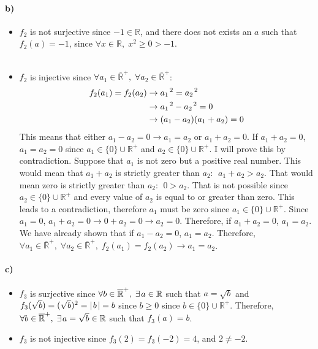 \documentclass[12pt]{article}
\newcommand\+{\mkern2mu}
\begin{document}
\paragraph{b)} %
\begin{itemize}
\item $f_2$ is not surjective since $-1 \in \mathbb{R}$, and there does not exists an $a$ such that $f_2(a) = -1$, since $\forall x \in \mathbb{R}, \; x^2 \geq 0 > -1$. \\
\\
\item $f_2$ is injective since $\forall a_1 \in \overline{\mathbb{R}}^+, \; \forall a_2 \in \overline{\mathbb{R}}^+$:
\begin{align*}
f_2(a_1) = f_2(a_2) &\rightarrow a_1 \+ ^2 = a_2 \+ ^2 \\
&\rightarrow a_1 \+ ^2 - a_2 \+ ^2 = 0 \\
&\rightarrow (a_1 - a_2)(a_1 + a_2) = 0
\end{align*}
\noindent
This means that either $a_1 - a_2 = 0 \rightarrow a_1 = a_2$ or $a_1 + a_2 = 0$.
If $a_1 + a_2 = 0$, $a_1 = a_2 = 0$ since $a_1 \in \{0\} \cup \mathbb{R}^+$ and $a_2 \in \{0\} \cup \mathbb{R}^+$.
I will prove this by contradiction.
Suppose that $a_1$ is not zero but a positive real number.
This would mean that $a_1 + a_2$ is strictly greater than $a_2$: $\; a_1 + a_2 > a_2$.
That would mean zero is strictly greater than $a_2$: $\; 0 > a_2$.
That is not possible since $a_2 \in \{0\} \cup \mathbb{R}^+$ and every value of $a_2$ is equal to or greater than zero.
This leads to a contradiction, therefore $a_1$ must be zero since $a_1 \in \{0\} \cup \mathbb{R}^+$.
Since $a_1 = 0$, $a_1 + a_2 = 0 \rightarrow 0 + a_2 = 0 \rightarrow a_2 = 0$.
Therefore, if $a_1 + a_2 = 0$, $a_1 = a_2$.
We have already shown that if $a_1 - a_2 = 0$, $a_1 = a_2$.
Therefore, $\forall a_1 \in \overline{\mathbb{R}}^+, \; \forall a_2 \in \overline{\mathbb{R}}^+, \; f_2(a_1) = f_2(a_2) \rightarrow a_1 = a_2$.
\end{itemize}

\newpage

\paragraph{c)}
\begin{itemize}
\item $f_3$ is surjective since $\forall b \in \overline{\mathbb{R}}^+, \; \exists \+ a \in \mathbb{R}$ such that $a = \sqrt{b}$ and $f_3(\sqrt{b}) = (\sqrt{b})^2 = \vert \+ b \+ \vert = b$ since $b \geq 0$ since $b \in \{0\} \cup \mathbb{R}^+$.
Therefore, $\forall b \in \overline{\mathbb{R}}^+, \; \exists \+ a = \sqrt{b} \in \mathbb{R}$ such that $f_3(a) = b$.
\item $f_3$ is not injective since $f_3(2) = f_3(-2) = 4$, and $2 \neq -2$.
\end{itemize}
\end{document}
